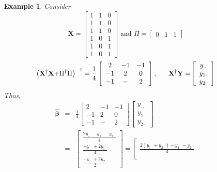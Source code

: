 \documentclass{article}
\newtheorem{example}[theorem]{Example}
\begin{document}
\begin{example}
Consider%
\begin{equation*}
\mathbf{X}=\left[ 
\begin{array}{ccc}
1 & 1 & 0 \\ 
1 & 1 & 0 \\ 
1 & 1 & 0 \\ 
1 & 0 & 1 \\ 
1 & 0 & 1 \\ 
1 & 0 & 1%
\end{array}%
\right] \text{ and }\Pi =\left[ 
\begin{array}{ccc}
0 & 1 & 1%
\end{array}%
\right]
\end{equation*}%
\begin{equation*}
\left( \mathbf{X}^{\dagger }\mathbf{X+}\Pi ^{\dagger }\Pi \right) ^{-1}=%
\frac{1}{4}\left[ 
\begin{array}{ccc}
2 & -1 & -1 \\ 
-1 & 2 & 0 \\ 
-1 & - & 2%
\end{array}%
\right] ,\text{\quad }\mathbf{X}^{\dagger }\mathbf{Y=}\left[ 
\begin{array}{c}
y_{\cdot \cdot } \\ 
y_{1\cdot } \\ 
y_{2\cdot }%
\end{array}%
\right]
\end{equation*}%
Thus,%
\begin{eqnarray*}
\mathbf{\hat{\beta}} &\mathbf{=}&\frac{1}{4}\left[ 
\begin{array}{ccc}
2 & -1 & -1 \\ 
-1 & 2 & 0 \\ 
-1 & - & 2%
\end{array}%
\right] \left[ 
\begin{array}{c}
y_{\cdot \cdot } \\ 
y_{1\cdot } \\ 
y_{2\cdot }%
\end{array}%
\right] \\
&=&\left[ 
\begin{array}{c}
\frac{2y_{\cdot \cdot }-y_{1\cdot }-y_{2\cdot }}{4} \\ 
\frac{-y_{\cdot \cdot }+2y_{1\cdot }}{4} \\ 
\frac{-y_{\cdot \cdot }+2y_{2\cdot }}{2}%
\end{array}%
\right] =\left[ 
\begin{array}{c}
\frac{2\left( y_{1\cdot }+y_{2\cdot }\right) -y_{1\cdot }-y_{2\cdot }}{4} \\ 

\end{array}
\end{eqnarray*}
\end{example}
\end{document}

